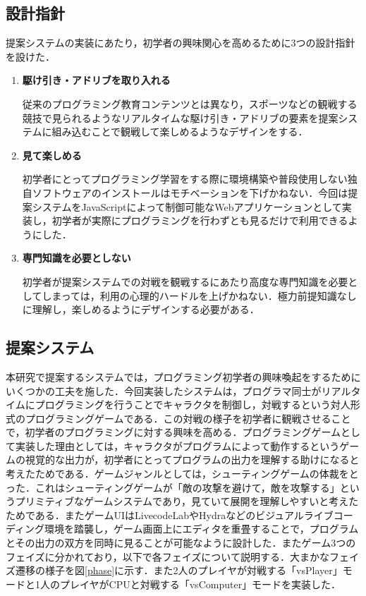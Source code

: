 \subsection{設計指針}

提案システムの実装にあたり，初学者の興味関心を高めるために3つの設計指針を設けた．

\begin{enumerate}
  \item {\bf 駆け引き・アドリブを取り入れる}

  従来のプログラミング教育コンテンツとは異なり，スポーツなどの観戦する競技で見られるようなリアルタイムな駆け引き・アドリブの要素を提案システムに組み込むことで観戦して楽しめるようなデザインをする．
  
  \item {\bf 見て楽しめる}

	初学者にとってプログラミング学習をする際に環境構築や普段使用しない独自ソフトウェアのインストールはモチベーションを下げかねない．今回は提案システムをJavaScriptによって制御可能なWebアプリケーションとして実装し，初学者が実際にプログラミングを行わずとも見るだけで利用できるようにした．

	\item {\bf 専門知識を必要としない}
	
	初学者が提案システムでの対戦を観戦するにあたり高度な専門知識を必要としてしまっては，利用の心理的ハードルを上げかねない．極力前提知識なしに理解し，楽しめるようにデザインする必要がある．
	

	
	
\end{enumerate}

\subsection{提案システム}

本研究で提案するシステムでは，プログラミング初学者の興味喚起をするためにいくつかの工夫を施した．今回実装したシステムは，プログラマ同士がリアルタイムにプログラミングを行うことでキャラクタを制御し，対戦するという対人形式のプログラミングゲームである．この対戦の様子を初学者に観戦させることで，初学者のプログラミングに対する興味を高める．プログラミングゲームとして実装した理由としては，キャラクタがプログラムによって動作するというゲームの視覚的な出力が，初学者にとってプログラムの出力を理解する助けになると考えたためである．ゲームジャンルとしては，シューティングゲームの体裁をとった．これはシューティングゲームが「敵の攻撃を避けて，敵を攻撃する」というプリミティブなゲームシステムであり，見ていて展開を理解しやすいと考えたためである．またゲームUIはLivecodeLab\cite{livecodelab}やHydra\cite{hydra}などのビジュアルライブコーディング環境を踏襲し，ゲーム画面上にエディタを重畳することで，プログラムとその出力の双方を同時に見ることが可能なように設計した．またゲーム3つのフェイズに分かれており，以下で各フェイズについて説明する．大まかなフェイズ遷移の様子を図\ref{phase}に示す．また2人のプレイヤが対戦する「vsPlayer」モードと1人のプレイヤがCPUと対戦する「vsComputer」モードを実装した．

